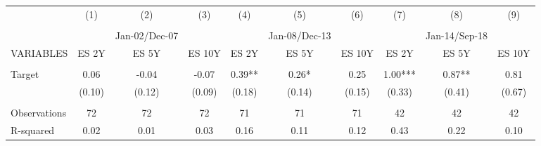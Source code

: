 \begin{tabular}{lccccccccc} \hline
 & (1) & (2) & (3) & (4) & (5) & (6) & (7) & (8) & (9) \\
 &  &  &  &  &  &  &  &  &  \\
 &  & Jan-02/Dec-07 &  &  & Jan-08/Dec-13 &  &  & Jan-14/Sep-18 &  \\
VARIABLES & ES 2Y & ES 5Y & ES 10Y & ES 2Y & ES 5Y & ES 10Y & ES 2Y & ES 5Y & ES 10Y \\ \hline
 &  &  &  &  &  &  &  &  &  \\
Target & 0.06 & -0.04 & -0.07 & 0.39** & 0.26* & 0.25 & 1.00*** & 0.87** & 0.81 \\
 & (0.10) & (0.12) & (0.09) & (0.18) & (0.14) & (0.15) & (0.33) & (0.41) & (0.67) \\
 &  &  &  &  &  &  &  &  &  \\
Observations & 72 & 72 & 72 & 71 & 71 & 71 & 42 & 42 & 42 \\
 R-squared & 0.02 & 0.01 & 0.03 & 0.16 & 0.11 & 0.12 & 0.43 & 0.22 & 0.10 \\ \hline
\end{tabular}
